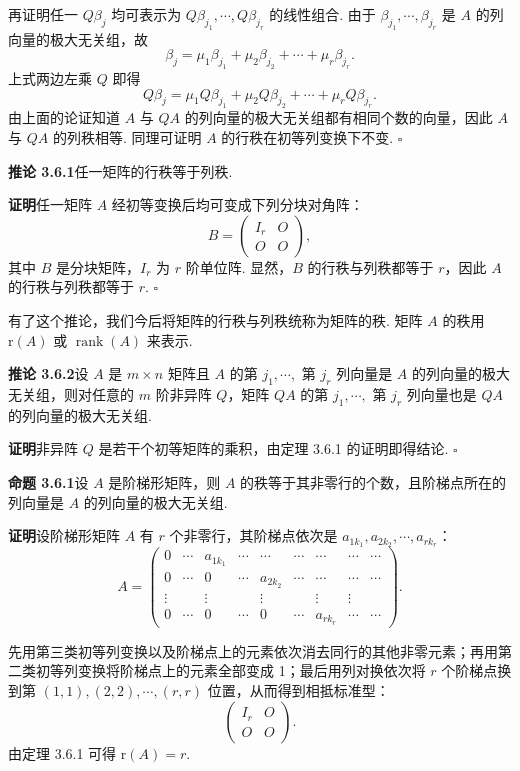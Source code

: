 \documentclass[UTF8,12pt,a4paper,fontset=fandol]{ctexart}
\begin{document}
再证明任一 $Q\beta_j$ 均可表示为 $Q\beta_{j_1},\cdots,Q\beta_{j_r}$ 的线性组合. 由于 $\beta_{j_1},\cdots,\beta_{j_r}$ 是 $A$ 的列向量的极大无关组，故
\[
\beta_j=\mu_1\beta_{j_1}+\mu_2\beta_{j_2}+\cdots+\mu_r\beta_{j_r}.
\]
上式两边左乘 $Q$ 即得
\[
Q\beta_j=\mu_1Q\beta_{j_1}+\mu_2Q\beta_{j_2}+\cdots+\mu_rQ\beta_{j_r}.
\]
由上面的论证知道 $A$ 与 $QA$ 的列向量的极大无关组都有相同个数的向量，因此 $A$ 与 $QA$ 的列秩相等. 同理可证明 $A$ 的行秩在初等列变换下不变. $\square$

\noindent\textbf{推论 3.6.1}\quad 任一矩阵的行秩等于列秩.

\noindent\textbf{证明}\quad 任一矩阵 $A$ 经初等变换后均可变成下列分块对角阵：
\[
B=\left(\begin{array}{cc}
I_r&O\\
O&O
\end{array}\right),
\]
其中 $B$ 是分块矩阵，$I_r$ 为 $r$ 阶单位阵. 显然，$B$ 的行秩与列秩都等于 $r$，因此 $A$ 的行秩与列秩都等于 $r$. $\square$

有了这个推论，我们今后将矩阵的行秩与列秩统称为矩阵的秩. 矩阵 $A$ 的秩用 $\mathrm{r}(A)$ 或 $\operatorname{rank}(A)$ 来表示.

\noindent\textbf{推论 3.6.2}\quad 设 $A$ 是 $m\times n$ 矩阵且 $A$ 的第 $j_1,\cdots,$ 第 $j_r$ 列向量是 $A$ 的列向量的极大无关组，则对任意的 $m$ 阶非异阵 $Q$，矩阵 $QA$ 的第 $j_1,\cdots,$ 第 $j_r$ 列向量也是 $QA$ 的列向量的极大无关组.

\noindent\textbf{证明}\quad 非异阵 $Q$ 是若干个初等矩阵的乘积，由定理 3.6.1 的证明即得结论. $\square$

\noindent\textbf{命题 3.6.1}\quad 设 $A$ 是阶梯形矩阵，则 $A$ 的秩等于其非零行的个数，且阶梯点所在的列向量是 $A$ 的列向量的极大无关组.

\noindent\textbf{证明}\quad 设阶梯形矩阵 $A$ 有 $r$ 个非零行，其阶梯点依次是 $a_{1k_1},a_{2k_2},\cdots,a_{rk_r}$：
\[
A=\left(\begin{array}{ccccccccc}
0&\cdots&a_{1k_1}&\cdots&\cdots&\cdots&\cdots&\cdots&\cdots\\
0&\cdots&0&\cdots&a_{2k_2}&\cdots&\cdots&\cdots&\cdots\\
\vdots&&\vdots&&\vdots&&\vdots&\vdots&\\
0&\cdots&0&\cdots&0&\cdots&a_{rk_r}&\cdots&\cdots
\end{array}\right).
\]

先用第三类初等列变换以及阶梯点上的元素依次消去同行的其他非零元素；再用第二类初等列变换将阶梯点上的元素全部变成 1；最后用列对换依次将 $r$ 个阶梯点换到第 $(1,1),(2,2),\cdots,(r,r)$ 位置，从而得到相抵标准型：
\[
\left(\begin{array}{cc}
I_r&O\\
O&O
\end{array}\right).
\]
由定理 3.6.1 可得 $\mathrm{r}(A)=r$.
\end{document}
